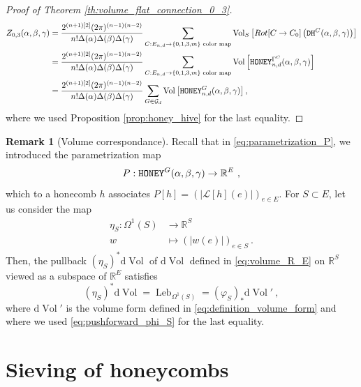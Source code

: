 \documentclass[11pt,a4paper]{amsart}
\providecommand{\diff}{\mathrm d}
\providecommand{\R}{\mathbb R}
\providecommand{\Vol}{\operatorname{Vol}}
\providecommand{\Leb}{\operatorname{Leb}}
\providecommand{\honey}{\texttt{\textsc{HONEY}}}
\providecommand{\dualhive}{\texttt{\textsc{DH}}}
\numberwithin{equation}{section}
\theoremstyle{definition}
\newtheorem{remark}[theorem]{Remark}
\begin{document}
\begin{proof}[Proof of Theorem \ref{th:volume_flat_connection_0_3}]
\begin{align*}
Z_{0, 3}(\alpha,\beta,\gamma) &=
    \frac{2^{(n+1) [2]}(2\pi)^{(n-1)(n-2)}} 
    {n! \Delta(\alpha) \Delta(\beta) \Delta(\gamma)} 
    \sum_{C:E_{n,d}\rightarrow \{0,1,3,m\} \text{ color map}} 
     \Vol_S\left[Rot[C\rightarrow C_0] \left(\dualhive^C(\alpha,\beta,\gamma)\right) \right]\\
    &=\frac{2^{(n+1) [2]}(2\pi)^{(n-1)(n-2)}} 
    {n! \Delta(\alpha) \Delta(\beta) \Delta(\gamma)} 
    \sum_{C:E_{n,d}\rightarrow \{0,1,3,m\} \text{ color map}} 
    \Vol \left[\honey_{n,d}^{\Gamma^C}(\alpha,\beta,\gamma)\right]\\
    &=\frac{2^{(n+1) [2]}(2\pi)^{(n-1)(n-2)}} 
    {n! \Delta(\alpha) \Delta(\beta) \Delta(\gamma)} 
    \sum_{G\in\mathcal{G}_d} 
    \Vol\left[\honey_{n,d}^{G}(\alpha,\beta,\gamma)\right],
\end{align*}
where we used Proposition \ref{prop:honey_hive} for the last equality.
\end{proof}

\begin{remark}[Volume correspondance]
    \label{rmk:volume_correspondance}
    Recall that in \eqref{eq:parametrization_P}, we introduced the parametrization map 
    \begin{equation*}
        P: \honey^G(\alpha, \beta, \gamma) \to \R^E \ ,
    \end{equation*}
    which to a honecomb $h$ associates $P[h] = (|\mathcal{L}[h](e)|)_{e \in E}$. 
    For $S \subset E$, let us consider the map 
    \begin{align*}
        \eta_S: \Omega^1(S) & \rightarrow \R^S \\
        w & \mapsto (|w(e)|)_{e \in S} \ .
    \end{align*}
    Then, the pullback $(\eta_S)^* \diff \Vol$ of $\diff \Vol$ defined 
    in \eqref{eq:volume_R_E} on $\R^S$ viewed as a subspace of $\R^E$ satisfies 
    \begin{equation}
        (\eta_S)^* \diff \Vol = \Leb_{\Omega^1(S)} = (\varphi_S)_* \diff \Vol' \ ,
    \end{equation}
    where $\diff \Vol'$ is the volume form defined 
in \eqref{eq:definition_volume_form} and where we used \eqref{eq:pushforward_phi_S} 
for the last equality.
\end{remark}

\section{Sieving of honeycombs}
\label{sec:sieving_honeycombs}
\end{document}
